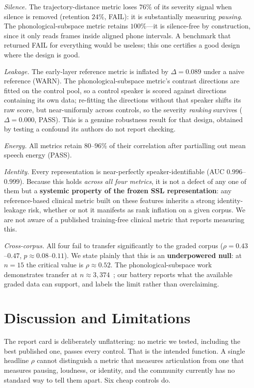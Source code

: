 \documentclass[conference]{IEEEtran}
\begin{document}
\emph{Silence.} The trajectory-distance metric loses $76\%$ of its severity signal
when silence is removed (retention $24\%$, FAIL): it is substantially measuring
\emph{pausing}. The phonological-subspace metric retains $100\%$---it is
silence-free by construction, since it only reads frames inside aligned phone
intervals. A benchmark that returned FAIL for everything would be useless; this one
certifies a good design where the design is good.

\emph{Leakage.} The early-layer reference metric is inflated by $\Delta{=}0.089$
under a naive reference (WARN). The phonological-subspace metric's contrast
directions are fitted on the control pool, so a control speaker is scored against
directions containing its own data; re-fitting the directions without that speaker
shifts its raw score, but near-uniformly across controls, so the severity
\emph{ranking} survives ($\Delta{=}0.000$, PASS). This is a genuine robustness
result for that design, obtained by testing a confound its authors do not report
checking.

\emph{Energy.} All metrics retain $80$--$96\%$ of their correlation after
partialling out mean speech energy (PASS).

\emph{Identity.} Every representation is near-perfectly speaker-identifiable (AUC
$0.996$--$0.999$). Because this holds \emph{across all four metrics}, it is not a
defect of any one of them but a \textbf{systemic property of the frozen SSL
representation}: any reference-based clinical metric built on these features
inherits a strong identity-leakage risk, whether or not it manifests as rank
inflation on a given corpus. We are not aware of a published training-free clinical
metric that reports measuring this.

\emph{Cross-corpus.} All four fail to transfer significantly to the graded corpus
($\rho{=}0.43$--$0.47$, $p{\approx}0.08$--$0.11$). We state plainly that this is an
\textbf{underpowered null}: at $n{=}15$ the critical value is $\rho{\approx}0.52$.
The phonological-subspace work demonstrates transfer at
$n{\approx}3{,}374$~\cite{frozenssl2026b}; our battery reports what the available
graded data can support, and labels the limit rather than overclaiming.

\section{Discussion and Limitations}
The report card is deliberately unflattering: no metric we tested, including the
best published one, passes every control. That is the intended function. A single
headline $\rho$ cannot distinguish a metric that measures articulation from one that
measures pausing, loudness, or identity, and the community currently has no standard
way to tell them apart. Six cheap controls do.
\end{document}
